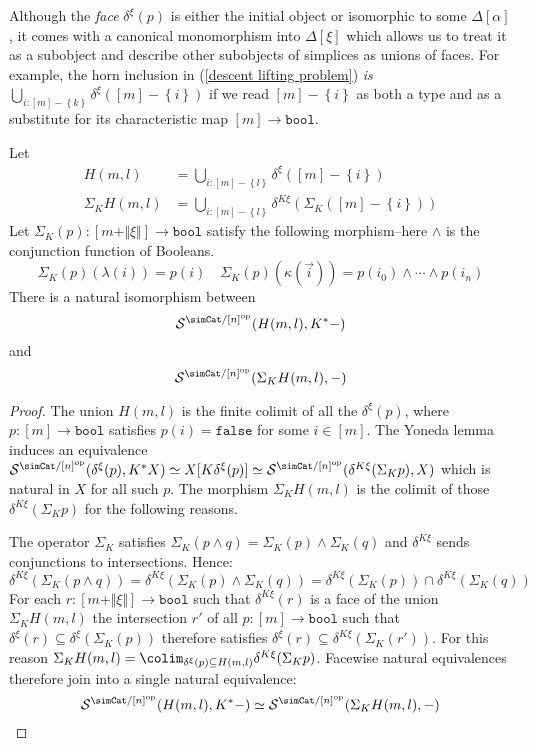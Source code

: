 \documentclass{tac}
\newcommand\cat\mathcal
\newcommand\set[1]{\left\{#1\right\}}
\newcommand\ri{^*}
\newcommand\dual{^{\mathrm{op}}}
\newcommand\of{:}
\newcommand\simplex\Delta
\newcommand\false{\mathtt{false}}
\newcommand\bool{\mathtt{bool}}
\newcommand\norm[1]{\Vert #1 \Vert}
\newcommand\ka\kappa
\newcommand\la\lambda
\newcommand\depsum{\Sigma_}
\newcommand\face\delta
\begin{document}
Although the \emph{face} $\face^\xi(p)$ is either the initial object or isomorphic to some $\simplex[\alpha]$, it comes with a canonical monomorphism into $\simplex[\xi]$ which allows us to treat it as a subobject and describe other subobjects of simplices as unions of faces. For example, the horn inclusion in (\ref{descent lifting problem}) \emph{is} $\bigcup_{i\of [m]-\set k} \face^\xi([m]-\set i)$ if we read $[m]-\set i$ as both a type and as a substitute for its characteristic map $[m]\to\bool$.


\begin{proposition} Let
\begin{align*}
H(m,l)&=\bigcup_{i\of [m]-\set l} \face^\xi([m]-\set i)\\
\depsum KH(m,l)&=\bigcup_{i\of [m]-\set l} \face^{K\xi}(\depsum K([m]-\set i))
\end{align*}
Let $\depsum K(p)\of [m+\norm\xi]\to \bool$ satisfy the following morphism--here $\mathord\land$ is the conjunction function of Booleans.
\[ \depsum K(p)(\la(i))=p(i)\quad\depsum K(p)(\ka(\vec i)) = p(i_0)\land\dotsm\land p(i_n) \] 
There is a natural isomorphism between
\[ \cat S^{\simCat/[n]\dual}(H(m,l),K\ri -) \] and 
\[ \cat S^{\simCat/[n]\dual}(\depsum KH(m,l),-) \] \label{K-universal}
\end{proposition}


\begin{proof} The union $H(m,l)$ is the finite colimit of all the $\face^\xi(p)$, where $p\of[m]\to\bool$ satisfies $p(i)=\false$ for some $i\in [m]$. The Yoneda lemma induces an equivalence $\cat S^{\simCat/[n]\dual}(\face^\xi(p),K\ri X)\simeq X[K\face^\xi(p)]\simeq \cat S^{\simCat/[n]\dual}(\face^{K\xi}(\depsum K p),X)$ which is natural in $X$ for all such $p$. The morphism $\depsum KH(m,l)$ is the colimit of those $\face^{K\xi}(\depsum K p)$ for the following reasons.

The operator $\depsum K$ satisfies $\depsum K(p\land q)=\depsum K(p)\land \depsum K(q)$ and $\face^{K\xi}$ sends conjunctions to intersections. Hence:
\[ \face^{K\xi}(\depsum K(p\land q)) = \face^{K\xi}(\depsum K(p)\land \depsum K(q)) = \face^{K\xi}(\depsum K(p))\cap \face^{K\xi}(\depsum K(q)) \]
For each $r\of[m+\norm\xi]\to \bool$ such that $\face^{K\xi}(r)$ is a face of the union $\depsum KH(m,l)$ the intersection $r'$ of all $p\of[m]\to \bool$ such that $\face^\xi(r)\subseteq\face^\xi(\depsum K(p))$ therefore satisfies $\face^\xi(r)\subseteq \face^{K\xi}(\depsum K(r'))$. For this reason $\depsum KH(m,l)=\colim_{\face^\xi(p)\subseteq H(m,l)}\face^{K\xi}(\depsum K p)$. Facewise natural equivalences therefore join into a single natural equivalence:
\[ \cat S^{\simCat/[n]\dual}(H(m,l),K\ri -)\simeq\cat S^{\simCat/[n]\dual}(\depsum K H(m,l), -) \]
\end{proof}
\end{document}
